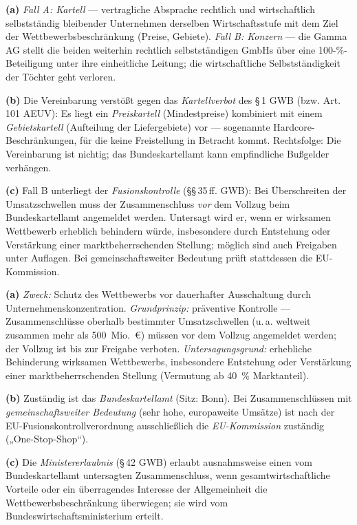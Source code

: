 \documentclass[11pt, a4paper]{article}
\begin{document}
\begin{loesung}[title={Lösung Aufgabe~7 --- Fallaufgabe Kartell vs. Konzern}]
\textbf{(a)} \emph{Fall A: Kartell} --- vertragliche Absprache rechtlich und
wirtschaftlich selbstständig bleibender Unternehmen derselben Wirtschaftsstufe mit dem
Ziel der Wettbewerbsbeschränkung (Preise, Gebiete). \emph{Fall B: Konzern} --- die Gamma
AG stellt die beiden weiterhin rechtlich selbstständigen GmbHs über eine 100-\%-Beteiligung
unter ihre einheitliche Leitung; die wirtschaftliche Selbstständigkeit der Töchter geht
verloren.

\textbf{(b)} Die Vereinbarung verstößt gegen das \emph{Kartellverbot} des \S\,1 GWB
(bzw. Art.\,101 AEUV): Es liegt ein \emph{Preiskartell} (Mindestpreise) kombiniert mit
einem \emph{Gebietskartell} (Aufteilung der Liefergebiete) vor --- sogenannte
Hardcore-Beschränkungen, für die keine Freistellung in Betracht kommt. Rechtsfolge: Die
Vereinbarung ist nichtig; das Bundeskartellamt kann empfindliche Bußgelder verhängen.

\textbf{(c)} Fall B unterliegt der \emph{Fusionskontrolle} (\S\S\,35\,ff. GWB): Bei
Überschreiten der Umsatzschwellen muss der Zusammenschluss \emph{vor} dem Vollzug beim
Bundeskartellamt angemeldet werden. Untersagt wird er, wenn er wirksamen Wettbewerb
erheblich behindern würde, insbesondere durch Entstehung oder Verstärkung einer
marktbeherrschenden Stellung; möglich sind auch Freigaben unter Auflagen. Bei
gemeinschaftsweiter Bedeutung prüft stattdessen die EU-Kommission.
\end{loesung}

\begin{loesung}[title={Lösung Aufgabe~8 --- Fusionskontrolle}]
\textbf{(a)} \emph{Zweck:} Schutz des Wettbewerbs vor dauerhafter Ausschaltung durch
Unternehmenskonzentration. \emph{Grundprinzip:} präventive Kontrolle ---
Zusammenschlüsse oberhalb bestimmter Umsatzschwellen (u.\,a. weltweit zusammen mehr als
500~Mio.~€) müssen vor dem Vollzug angemeldet werden; der Vollzug ist bis zur Freigabe
verboten. \emph{Untersagungsgrund:} erhebliche Behinderung wirksamen Wettbewerbs,
insbesondere Entstehung oder Verstärkung einer marktbeherrschenden Stellung (Vermutung
ab 40~\% Marktanteil).

\textbf{(b)} Zuständig ist das \emph{Bundeskartellamt} (Sitz: Bonn). Bei
Zusammenschlüssen mit \emph{gemeinschaftsweiter Bedeutung} (sehr hohe, europaweite
Umsätze) ist nach der EU-Fusionskontrollverordnung ausschließlich die
\emph{EU-Kommission} zuständig („One-Stop-Shop``).

\textbf{(c)} Die \emph{Ministererlaubnis} (\S\,42 GWB) erlaubt ausnahmsweise einen vom
Bundeskartellamt untersagten Zusammenschluss, wenn gesamtwirtschaftliche Vorteile oder
ein überragendes Interesse der Allgemeinheit die Wettbewerbsbeschränkung überwiegen;
sie wird vom Bundeswirtschaftsministerium erteilt.
\end{loesung}
\end{document}
